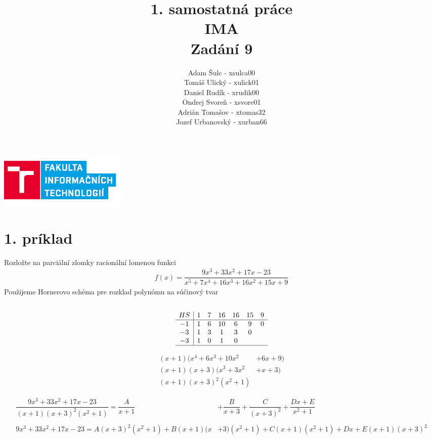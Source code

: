 \documentclass[a4paper]{article}
\title{\textbf{1. samostatná práce\\IMA\\Zadání 9}}
\author{Adam Šulc - xsulca00\\ Tomáš Ulický - xulick01\\ Daniel Rudík - xrudik00\\ Ondrej Svoreň - xsvore01\\ Adrián Tomašov - xtomas32\\ Jozef Urbanovský - xurban66}
\date{}
\begin{document}
	\maketitle
	\begin{center}
	\includegraphics[clip]{FIT.png}
	\end{center}
	\newpage
	\section*{1. príklad}
	
	Rozložte na parciální zlomky racionální lomenou funkci 
	\begin{align*}
	f(x)= \dfrac{9x^3+33x^2+17x-23} {x^5+7x^4+16x^3+16x^2+15x+9}
	\end{align*}
	Použijeme Hornerovo schéma pre rozklad polynómu na súčinový tvar \\ \\
	\begin{align*}
	\begin{array}{c|cccccc}
	HS & 1 & 7 & 16 & 16 & 15 & 9 \\ \hline
	-1 & 1 & 6 & 10 & 6  & 9  & 0 \\ 
	-3 & 1 & 3 & 1  & 3  & 0      \\ 
	-3 & 1 & 0 & 1 & 0            \\ \hline
	\end{array}
	\end{align*}
	
	\begin{align*}
	(x+1)(x^4+6x^3+10x^2&+6x+9) \\
	(x+1)(x+3)(x^3+3x^2&+x+3)   \\
	(x+1)(x+3)^2(x^2+1)&
	\end{align*}
	
	\begin{align*}
	\dfrac{9x^3+33x^2+17x-23} {(x+1)(x+3)^2(x^2+1)} = 
	\dfrac{A}{x+1} & + \dfrac{B}{x+3} + \dfrac{C}{(x+3)^2} + \dfrac{Dx+E}{x^2+1}\\
	\\
	9x^3+33x^2+17x-23 = 
	A(x+3)^2(x^2+1) + B(x+1)(x&+3)(x^2+1) + C(x+1)(x^2+1) + Dx+E(x+1)(x+3)^2
	\end{align*}
\end{document}
